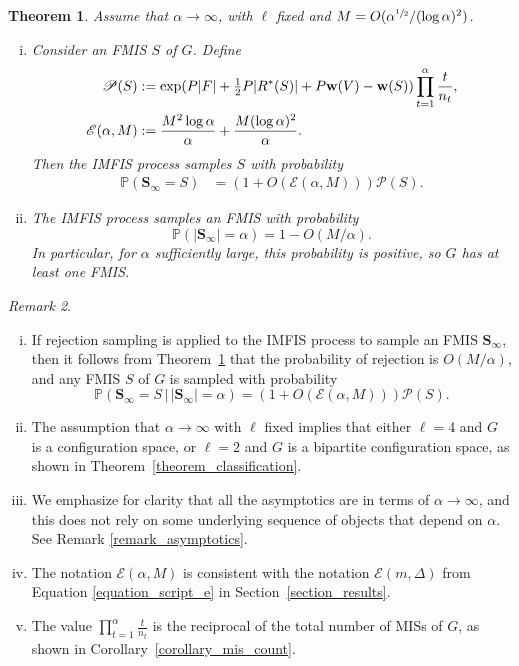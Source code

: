 \documentclass{article}
\theoremstyle{plain}
\newtheorem{theorem}{Theorem}[section]
\theoremstyle{remark}
\newtheorem{remark}[theorem]{Remark}
\theoremstyle{plain}
\numberwithin{equation}{section}
\renewcommand{\b}{{\bf{w}}}
\begin{document}
	\begin{theorem}\label{theorem_main}
		Assume that $\alpha\to\infty$, with $\ell$ fixed and $M=O(\alpha^{\sfrac12}/(\log\alpha)^2)$.
		\begin{enumerate}[(i)]
			\item\label{theorem_main_equation} Consider an FMIS $S$ of $G$. Define 
			\begin{align}
				\mathscr{P}(S)&:=\exp(P|F|+\tfrac12P|R^*(S)|+P\b(V)-\b(S))\prod_{t=1}^{\alpha}\frac{t}{n_t},\\
				\mathscr{E}(\alpha,M)&:=\frac{M^2\log\alpha}{\alpha}+\frac{M(\log\alpha)^2}{\alpha}.
			\end{align}
			Then the IMFIS process samples $S$ with probability
			\begin{align}
				\mathbb{P}(\boldsymbol{S}_{\infty}=S)&=(1+O(\mathscr{E}(\alpha,M)))\mathscr{P}(S).
			\end{align}
			\item\label{theorem_main_termination} The IMFIS process samples an FMIS with probability $$\mathbb{P}(|\boldsymbol{S}_{\infty}|=\alpha)=1-O(M/\alpha).$$ In particular, for $\alpha$ sufficiently large, this probability is positive, so $G$ has at least one FMIS.
		\end{enumerate}
	\end{theorem}
	
	\begin{remark}
		\begin{enumerate}[(i)]
			\item If rejection sampling is applied to the IMFIS process to sample an FMIS $\boldsymbol{S}_{\infty}$, then it follows from Theorem~\ref{theorem_main} that the probability of rejection is $O(M/\alpha)$, and any FMIS $S$ of $G$ is sampled with probability $$\mathbb{P}(\boldsymbol{S}_{\infty}=S\,|\,|\boldsymbol{S}_{\infty}|=\alpha)=(1+O(\mathscr{E}(\alpha,M)))\mathscr{P}(S).$$
			\item The assumption that $\alpha\to\infty$ with $\ell$ fixed implies that either $\ell=4$ and $G$ is a configuration space, or $\ell=2$ and $G$ is a bipartite configuration space, as shown in Theorem~\ref{theorem_classification}.
			\item We emphasize for clarity that all the asymptotics are in terms of $\alpha\to\infty$, and this does not rely on some underlying sequence of objects that depend on $\alpha$. See Remark \ref{remark_asymptotics}.
			\item The notation $\mathscr{E}(\alpha,M)$ is consistent with the notation $\mathscr{E}(m,\Delta)$ from Equation \eqref{equation_script_e} in Section~\ref{section_results}.
			\item The value $\prod_{t=1}^{\alpha}\frac{t}{n_t}$ is the reciprocal of the total number of MISs of $G$, as shown in Corollary~\ref{corollary_mis_count}.
		\end{enumerate}
	\end{remark}
	
\end{document}
